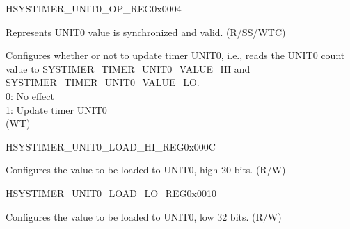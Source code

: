 \begin{register}{H}{SYSTIMER\_UNIT0\_OP\_REG}{0x0004}\label{regdesc:SYSTIMERUNIT0OPREG}
%
%
%
%
\regnewline%
\begin{regdesc}\begin{reglist}
\label{fielddesc:SYSTIMERTIMERUNIT0VALUEVALID}\item [SYSTIMER\_TIMER\_UNIT0\_VALUE\_VALID] Represents UNIT0 value is synchronized and valid. (R/SS/WTC)
\label{fielddesc:SYSTIMERTIMERUNIT0UPDATE}\item [SYSTIMER\_TIMER\_UNIT0\_UPDATE] Configures whether or not to update timer UNIT0, i.e., reads the UNIT0 count value to \hyperref[fielddesc:SYSTIMERTIMERUNIT0VALUEHI]{SYSTIMER\_TIMER\_UNIT0\_VALUE\_HI} and \hyperref[fielddesc:SYSTIMERTIMERUNIT0VALUELO]{SYSTIMER\_TIMER\_UNIT0\_VALUE\_LO}. \\
0: No effect\\
1: Update timer UNIT0 \\
(WT)
\end{reglist}\end{regdesc}
\end{register}


\begin{register}{H}{SYSTIMER\_UNIT0\_LOAD\_HI\_REG}{0x000C}\label{regdesc:SYSTIMERUNIT0LOADHIREG}
%
%
\regnewline%
\begin{regdesc}\begin{reglist}
\label{fielddesc:SYSTIMERTIMERUNIT0LOADHI}\item [SYSTIMER\_TIMER\_UNIT0\_LOAD\_HI] Configures the value to be loaded to UNIT0, high 20 bits. (R/W)
\end{reglist}\end{regdesc}
\end{register}


\begin{register}{H}{SYSTIMER\_UNIT0\_LOAD\_LO\_REG}{0x0010}\label{regdesc:SYSTIMERUNIT0LOADLOREG}
%
\regnewline%
\begin{regdesc}\begin{reglist}
\label{fielddesc:SYSTIMERTIMERUNIT0LOADLO}\item [SYSTIMER\_TIMER\_UNIT0\_LOAD\_LO] Configures the value to be loaded to UNIT0, low 32 bits. (R/W)
\end{reglist}\end{regdesc}
\end{register}


